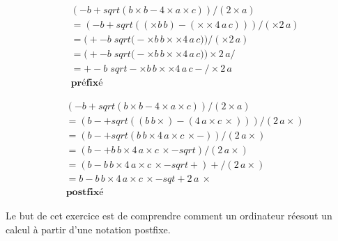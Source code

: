 \documentclass{report}
\begin{document}
\begin{multicols*}{3}
\begin{align*}
    &(-b + sqrt(b\times b -4 \times a \times c))/(2 \times a)
    \\ 
    &= 
    (-b + sqrt((\times b \, b) - (\times \times 4\,  a \, c)  ))/(\times 2 \, a)
    \\
    &=\bigl(+ -b \; sqrt\bigl( - \times b \, b  \times \times 4\,  a \, c   \bigr)  \bigr)/(\times 2 \, a)
    \\
    &=\bigl(+ -b \; sqrt\bigl( - \times b \, b  \times \times 4\,  a \, c   \bigr)  \bigr) \times 2 \, a /
    \\ 
    &= + -b \; sqrt - \times b \, b  \times \times 4\,  a \, c -  / \times 2 \, a 
    \\
    & \textbf{préfixé}
\end{align*}


\begin{align*}
    &(-b + sqrt(b\times b -4 \times a \times c))/(2 \times a)
    \\ 
    &= 
    (b- + sqrt((b \, b \times) - (4 \,  a \times  c \, \times)  ))/(2 \, a \times)
    \\
    &=(b- + sqrt( b \, b \times  4 \,  a \times  c \, \times -  ))/(2 \, a \times)
    \\
    &=(b- + b \, b \times  4 \,  a \times  c \, \times -  sqrt )  /(2 \, a \times)
    \\
    &=(b- b \, b \times  4 \,  a \times  c \, \times -  sqrt +) + /(2 \, a \times)
    \\
    &= b- b \, b \times  4 \,  a \times  c \, \times -  sqt + 2 \, a \ \times
    \\
            & \textbf{postfixé}
\end{align*}

\begin{Exercice}{}{}
Le but de cet exercice est de comprendre comment un ordinateur réesout un
calcul à partir d’une notation postfixe.   
\end{Exercice}



\end{multicols*}
\end{document}
